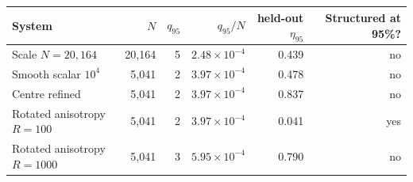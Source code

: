 \begin{tabularx}{\textwidth}{Xrrrrr}
\toprule
System & $N$ & $q_{95}$ & $q_{95}/N$ & held-out $\eta_{95}$ & Structured at 95\%? \\
\midrule
Scale $N=20{,}164$ & 20,164 & 5 & $2.48\times10^{-4}$ & 0.439 & no \\
Smooth scalar $10^4$ & 5,041 & 2 & $3.97\times10^{-4}$ & 0.478 & no \\
Centre refined & 5,041 & 2 & $3.97\times10^{-4}$ & 0.837 & no \\
Rotated anisotropy $R=100$ & 5,041 & 2 & $3.97\times10^{-4}$ & 0.041 & yes \\
Rotated anisotropy $R=1000$ & 5,041 & 3 & $5.95\times10^{-4}$ & 0.790 & no \\
\bottomrule
\end{tabularx}

